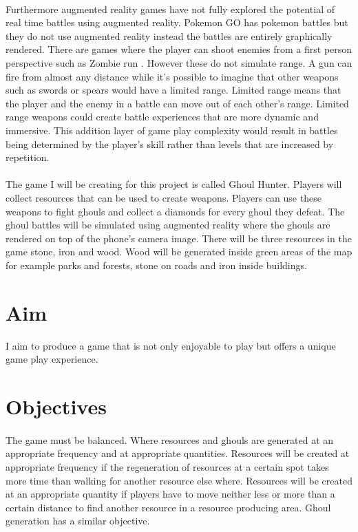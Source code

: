 \documentclass{article}
\begin{document}
	\paragraph{}Furthermore augmented reality games have not fully explored the potential of real time battles using augmented reality. Pokemon GO has pokemon battles but they do not use augmented reality instead the battles are entirely graphically rendered. There are games where the player can shoot enemies from a first person perspective such as Zombie run \cite{ZombiesRun}. However these do not simulate range. A gun can fire from almost any distance while it's possible to imagine that other weapons such as swords or spears would have a limited range. Limited range means that the player and the enemy in a battle can move out of each other's range.  Limited range weapons could create battle experiences that are more dynamic and immersive. This addition layer of game play complexity would result in battles being determined by the player's skill rather than levels that are increased by repetition.   
	
	\paragraph{}The game I will be creating for this project is called Ghoul Hunter. Players will collect resources that can be used to create weapons. Players can use these weapons to fight ghouls and collect a diamonds for every ghoul they defeat. The ghoul battles will be simulated using augmented reality where the ghouls are rendered on top of the phone's camera image. There will be three resources in the game stone, iron and wood. Wood will be generated inside green areas of the map for example parks and forests, stone on roads and iron inside buildings.
	
	\section{Aim}
	I aim to produce a game that is not only enjoyable to play but offers a unique game play experience.
	
	\section{Objectives}
	\paragraph{}The game must be balanced. Where resources and ghouls are generated at an appropriate frequency and at appropriate quantities. Resources will be created at appropriate frequency if the regeneration of resources at a certain spot takes more time than walking for another resource else where. Resources will be created at an appropriate quantity if players have to move neither less or more than a certain distance to find another resource in a resource producing area. Ghoul generation has a similar objective.
	
\end{document}
